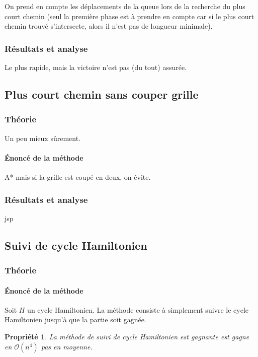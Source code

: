 \documentclass[french,a4paper]{article}
\newtheorem{property}{Propriété}[section]
\begin{document}
On prend en compte les déplacements de la queue lors de la recherche du plus court chemin (seul la première phase est à prendre en compte car si le plus court chemin trouvé s'intersecte, alors il n'est pas de longueur minimale).

\subsubsection{Résultats et analyse}
Le plus rapide, mais la victoire n'est pas (du tout) assurée.

\subsection{Plus court chemin sans couper grille}
\subsubsection{Théorie}
Un peu mieux sûrement.

\paragraph{Énoncé de la méthode}
A* mais si la grille est coupé en deux, on évite.

\subsubsection{Résultats et analyse}

jsp

\subsection{Suivi de cycle Hamiltonien}

\subsubsection{Théorie}

\paragraph{Énoncé de la méthode}
Soit $H$ un cycle Hamiltonien.
La méthode consiste à simplement suivre le cycle Hamiltonien jusqu'à que la partie soit gagnée.

\begin{property}
La méthode de suivi de cycle Hamiltonien est gagnante est gagne en $\mathcal{O}(n^4)$ pas en moyenne.
\end{property}
\end{document}

